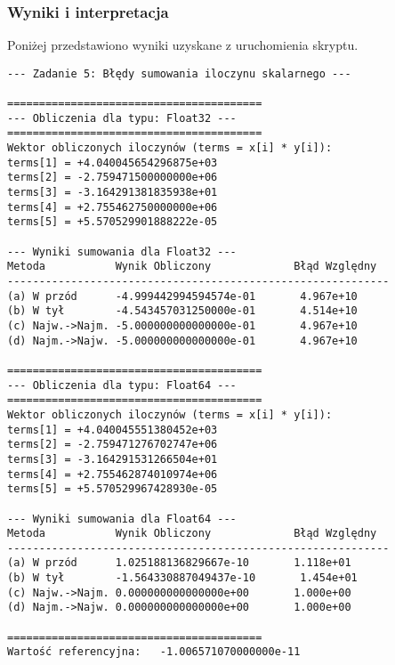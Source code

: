 \documentclass[11pt, a4paper]{article}
\begin{document}
\subsubsection{Wyniki i interpretacja}
Poniżej przedstawiono wyniki uzyskane z uruchomienia skryptu.
\begin{verbatim}
--- Zadanie 5: Błędy sumowania iloczynu skalarnego ---

========================================
--- Obliczenia dla typu: Float32 ---
========================================
Wektor obliczonych iloczynów (terms = x[i] * y[i]):
terms[1] = +4.040045654296875e+03
terms[2] = -2.759471500000000e+06
terms[3] = -3.164291381835938e+01
terms[4] = +2.755462750000000e+06
terms[5] = +5.570529901888222e-05

--- Wyniki sumowania dla Float32 ---
Metoda           Wynik Obliczony             Błąd Względny
------------------------------------------------------------
(a) W przód      -4.999442994594574e-01       4.967e+10
(b) W tył        -4.543457031250000e-01       4.514e+10
(c) Najw.->Najm. -5.000000000000000e-01       4.967e+10
(d) Najm.->Najw. -5.000000000000000e-01       4.967e+10

========================================
--- Obliczenia dla typu: Float64 ---
========================================
Wektor obliczonych iloczynów (terms = x[i] * y[i]):
terms[1] = +4.040045551380452e+03
terms[2] = -2.759471276702747e+06
terms[3] = -3.164291531266504e+01
terms[4] = +2.755462874010974e+06
terms[5] = +5.570529967428930e-05

--- Wyniki sumowania dla Float64 ---
Metoda           Wynik Obliczony             Błąd Względny
------------------------------------------------------------
(a) W przód      1.025188136829667e-10       1.118e+01
(b) W tył        -1.564330887049437e-10       1.454e+01
(c) Najw.->Najm. 0.000000000000000e+00       1.000e+00
(d) Najm.->Najw. 0.000000000000000e+00       1.000e+00

========================================
Wartość referencyjna:   -1.006571070000000e-11

\end{verbatim}
\end{document}
